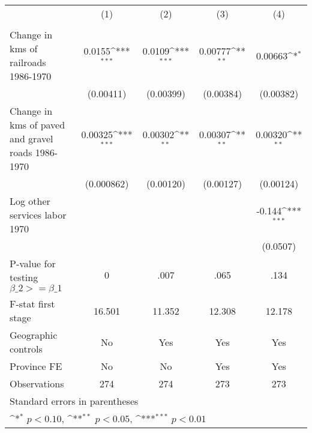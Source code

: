 {
\def\sym#1{\ifmmode^{#1}\else\(^{#1}\)\fi}
\begin{tabular}{l*{4}{c}}
\hline\hline
                &\multicolumn{1}{c}{(1)}&\multicolumn{1}{c}{(2)}&\multicolumn{1}{c}{(3)}&\multicolumn{1}{c}{(4)}\\
                &\multicolumn{1}{c}{}&\multicolumn{1}{c}{}&\multicolumn{1}{c}{}&\multicolumn{1}{c}{}\\
\hline
Change in kms of railroads 1986-1970&   0.0155\sym{***}&   0.0109\sym{***}&  0.00777\sym{**} &  0.00663\sym{*}  \\
                &(0.00411)         &(0.00399)         &(0.00384)         &(0.00382)         \\
[1em]
Change in kms of paved and gravel roads 1986-1970&  0.00325\sym{***}&  0.00302\sym{**} &  0.00307\sym{**} &  0.00320\sym{**} \\
                &(0.000862)         &(0.00120)         &(0.00127)         &(0.00124)         \\
[1em]
Log other services labor 1970&                  &                  &                  &   -0.144\sym{***}\\
                &                  &                  &                  & (0.0507)         \\
\hline
P-value for testing $\beta\_{2} >= \beta\_{1}$&        0         &     .007         &     .065         &     .134         \\
F-stat first stage&   16.501         &   11.352         &   12.308         &   12.178         \\
Geographic controls&       No         &      Yes         &      Yes         &      Yes         \\
Province FE     &       No         &       No         &      Yes         &      Yes         \\
Observations    &      274         &      274         &      273         &      273         \\
\hline\hline
\multicolumn{5}{l}{\footnotesize Standard errors in parentheses}\\
\multicolumn{5}{l}{\footnotesize \sym{*} \(p<0.10\), \sym{**} \(p<0.05\), \sym{***} \(p<0.01\)}\\
\end{tabular}
}
